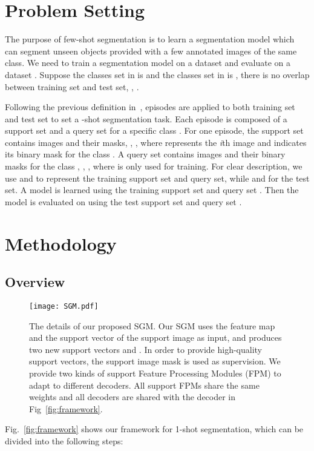 \documentclass[final]{cvpr}
\begin{document}
\section{Problem Setting}
The purpose of few-shot segmentation is to learn a segmentation model which can segment unseen objects provided with a few annotated images of the same class. We need to train a segmentation model on a dataset  and evaluate on a dataset . Suppose the classes set in  is  and the classes set in  is ,  there is no overlap between training set and test set, \ie, .

Following the previous definition in~\cite{shaban2017one}, episodes are applied to both training set  and test set  to set a -shot segmentation task. Each episode is composed of a support set  and a query set  for a specific class . For one episode, the support set contains  images and their masks, \ie, , where  represents the \emph{i}th image and  indicates its binary mask for the class . A query set contains  images and their binary masks for the class , \ie, , where  is only used for training. For clear description, we use  and  to represent the training support set and query set, while  and  for the test set. A model is learned using the training support set  and query set . Then the model is evaluated on  using the test support set  and query set . 




\section{Methodology}

\subsection{Overview}
\begin{figure*}
	\centering
	\texttt{[image: SGM.pdf]}
	\caption{The details of our proposed SGM. Our SGM uses the feature map  and the support vector  of the support image as input, and produces two new support vectors  and . In order to provide high-quality support vectors, the support image mask is used as supervision. We provide two kinds of support Feature Processing Modules (FPM) to adapt to different decoders. All support FPMs share the same weights and all decoders are shared with the decoder in Fig~\ref{fig:framework}.}
	\label{fig:SGM}
\end{figure*}

Fig.~\ref{fig:framework} shows our framework for 1-shot segmentation, which can be divided into the following steps:
\end{document}
